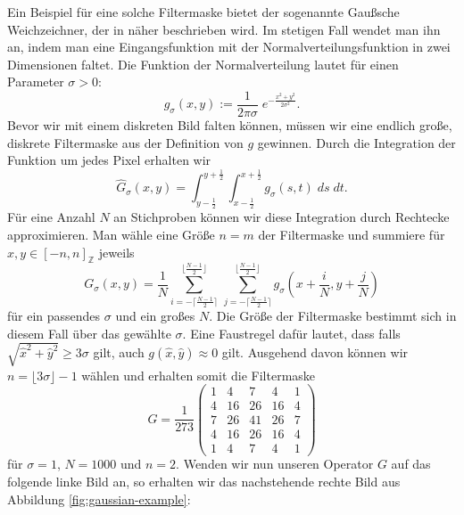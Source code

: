 \documentclass[a4paper, 11pt]{report}
\theoremstyle{definition}
\begin{document}
		Ein Beispiel für eine solche Filtermaske bietet der sogenannte Gaußsche Weichzeichner, der in \cite{gaussianblur} näher beschrieben wird. Im stetigen Fall wendet man ihn an, indem man eine Eingangsfunktion mit der Normalverteilungsfunktion in zwei Dimensionen faltet. Die Funktion der Normalverteilung lautet für einen Parameter $\sigma > 0$:
		$$ g_\sigma(x,y) := \frac{1}{2 \pi \sigma} \;e ^{-\frac{x^2 + y^2}{2\sigma^2}}. $$
		Bevor wir mit einem diskreten Bild falten können, müssen wir eine endlich große, diskrete Filtermaske aus der Definition von $g$ gewinnen. Durch die Integration der Funktion um jedes Pixel erhalten wir
		$$\hat G_\sigma(x,y) = \int_{y-\frac{1}{2}}^{y+\frac{1}{2}} \int_{x-\frac{1}{2}}^{x+\frac{1}{2}} g_\sigma(s,t) \; ds \; dt.$$
		Für eine Anzahl $N$ an Stichproben können wir diese Integration durch Rechtecke approximieren.
		Man wähle eine Größe $n = m$ der Filtermaske und summiere für $x,y \in [-n, n]_\mathbb{Z}$ jeweils
		$$G_\sigma(x,y) = \frac{1}{N}\sum_{i=-\lceil\frac{N-1}{2}\rceil}^{\lfloor\frac{N-1}{2}\rfloor}\, \sum_{j=-\lceil\frac{N-1}{2}\rceil}^{\lfloor\frac{N-1}{2}\rfloor} g_\sigma(x+\frac{i}{N},y+\frac{j}{N})$$
		für ein passendes $\sigma$ und ein großes $N$.
		Die Größe der Filtermaske bestimmt sich in diesem Fall über das gewählte $\sigma$. Eine Faustregel dafür lautet, dass falls $\sqrt{\hat x^2 + \hat y^2} \geq 3\sigma$ gilt, auch $g(\hat x,\hat y) \approx 0$ gilt. Ausgehend davon können wir $n = \lfloor3\sigma\rfloor-1$ wählen und erhalten somit die Filtermaske
		$$G = \frac{1}{273}
		\begin{pmatrix}
			1&4&7&4&1\\
			4&16&26&16&4\\
			7&26&41&26&7\\
			4&16&26&16&4\\
			1&4&7&4&1
		\end{pmatrix}$$
 		für $\sigma = 1$, $N = 1000$ und $n = 2$. Wenden wir nun unseren Operator $G$ auf das folgende linke Bild an, so erhalten wir das nachstehende rechte Bild aus Abbildung \ref{fig:gaussian-example}:
\end{document}
